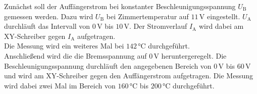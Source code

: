Zunächst soll der Auffängerstrom bei konstanter Beschleunigungsspannung $U_\text{B}$ gemessen werden.
Dazu wird $U_\text{B}$ bei Zimmertemperatur auf $11 \,\unit{\volt}$ eingestellt.
$U_\text{A}$ durchläuft das Intervall von $0 \,\unit{\volt}$ bis $10 \,\unit{\volt}$.
Der Stromverlauf $I_\text{A}$ wird dabei am XY-Schreiber gegen $I_\text{A}$ aufgetragen. \\

Die Messung wird ein weiteres Mal bei $142 \,\unit{\celsius}$ durchgeführt. \\

Anschließend wird die die Bremsspannung auf $0 \,\unit{\volt}$ heruntergeregelt.
Die Beschleunigungsspannung durchläuft den angegebenen Bereich von
$0 \,\unit{\volt}$ bis $60 \,\unit{\volt}$ und wird am XY-Schreiber gegen den Auffängerstrom aufgetragen.
Die Messung wird dabei zwei Mal im Bereich von $160 \,\unit{\celsius}$ bis $200 \,\unit{\celsius}$ durchgeführt.



